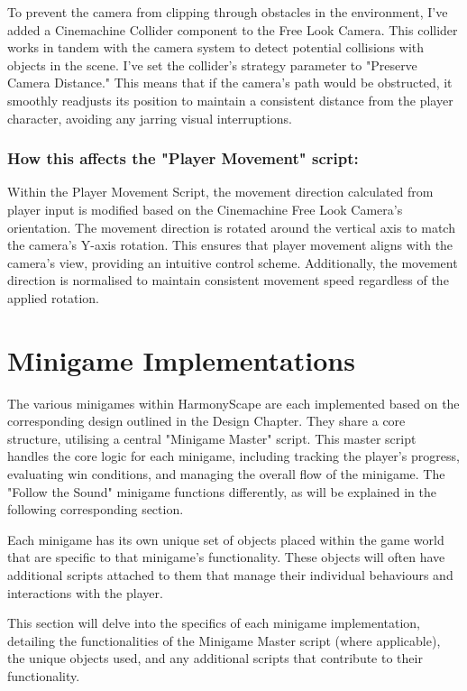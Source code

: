 \documentclass{l4proj}
\begin{document}
To prevent the camera from clipping through obstacles in the environment, I've added a Cinemachine Collider component to the Free Look Camera. This collider works in tandem with the camera system to detect potential collisions with objects in the scene. I've set the collider's strategy parameter to "Preserve Camera Distance." This means that if the camera's path would be obstructed, it smoothly readjusts its position to maintain a consistent distance from the player character, avoiding any jarring visual interruptions.

\subsubsection{How this affects the "Player Movement" script:} Within the Player Movement Script, the movement direction calculated from player input is modified based on the Cinemachine Free Look Camera's orientation. The movement direction is rotated around the vertical axis to match the camera's Y-axis rotation. This ensures that player movement aligns with the camera's view, providing an intuitive control scheme. Additionally, the movement direction is normalised to maintain consistent movement speed regardless of the applied rotation.

\section{Minigame Implementations}
The various minigames within HarmonyScape are each implemented based on the corresponding design outlined in the Design Chapter. They share a core structure, utilising a central "Minigame Master" script. This master script handles the core logic for each minigame, including tracking the player's progress, evaluating win conditions, and managing the overall flow of the minigame. The "Follow the Sound" minigame functions differently, as will be explained in the following corresponding section. 

Each minigame has its own unique set of objects placed within the game world that are specific to that minigame's functionality. These objects will often have additional scripts attached to them that manage their individual behaviours and interactions with the player.

This section will delve into the specifics of each minigame implementation, detailing the functionalities of the Minigame Master script (where applicable), the unique objects used, and any additional scripts that contribute to their functionality.
\end{document}
